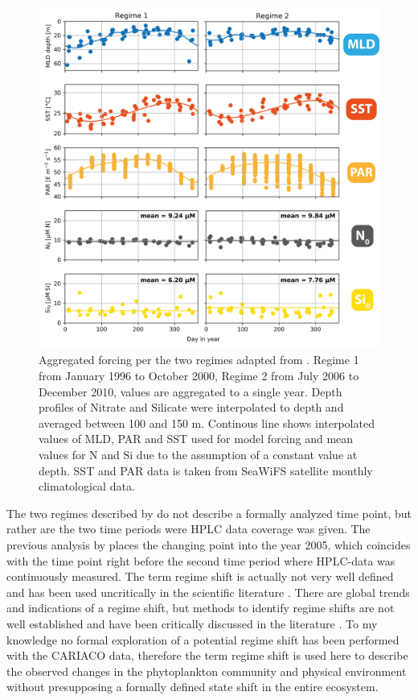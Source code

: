\begin{figure}
\centering
\includegraphics[trim = 0mm 0mm 0mm 0mm, clip, width=1.\linewidth]{./Chp2-Pre/ForcingAsset411.png}
\caption[Scheme]{\small {Aggregated forcing per the two regimes adapted from \citet{Pinckney2015}. Regime 1 from January 1996 to October 2000, Regime 2 from July 2006 to December 2010, values are aggregated to a single year. Depth profiles of Nitrate and Silicate were interpolated to depth and averaged between 100 and 150 m. Continous line shows interpolated values of MLD, PAR and SST used for model forcing and mean values for N and Si due to the assumption of a constant value at depth. SST and PAR data is taken from SeaWiFS satellite monthly climatological data. }}
\label{ModelForcing}
\end{figure}

The two regimes described by \citet{Pinckney2015} do not describe a formally analyzed time point, but rather are the two time periods were HPLC data coverage was given. The previous analysis by \citet{Taylor2012} places the changing point into the year 2005, which coincides with the time point right before the second time period where HPLC-data was continuously measured. The term regime shift is actually not very well defined and has been used uncritically in the scientific literature \citep{DeYoung2004a}. There are global trends and indications of a regime shift, but methods to identify regime shifts are not well established and have been critically discussed in the literature \citep{Steele2004a, Mantua2004a, Litzow2016a}. To my knowledge no formal exploration of a potential regime shift has been performed with the CARIACO data, therefore the term regime shift is used here to describe the observed changes in the phytoplankton community and physical environment without presupposing a formally defined state shift in the entire ecosystem. 

